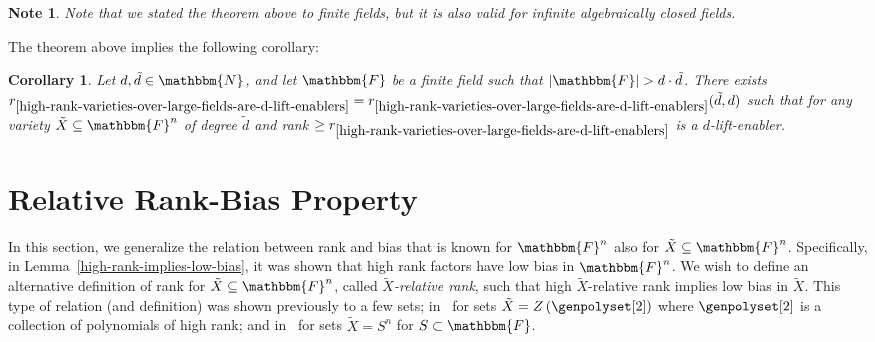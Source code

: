 \documentclass[10pt,a4paper]{article}
\newtheorem{corollary}[theorem]{Corollary}
\newtheorem*{note*}{Note}
\newcommand{\parens}[1]{\left( #1 \right)}
\newcommand{\basefield}[0]{\mathbbm{F}}
\newcommand{\blocklength}[0]{n}
\newcommand{\field}[0]{\basefield^{\blocklength}}
\newcommand{\degree}[0]{d}
\newcommand{\naturalnumbersset}[0]{\mathbbm{N}}
\newcommand{\variety}{{\tilde{X}}}
\newcommand{\varietydeg}[0]{\tilde{\degree}}
\newcommand{\zerofunc}[1]{Z \parens{#1}}
\newcommand{\rankfunc}[0]{{{{r}}}}
\newcommand{\abs}[1]{\left| #1 \right|}
\begin{document}
\begin{note*}
    Note that we stated the theorem above to finite fields, but it is also valid for infinite algebraically closed fields.
\end{note*}
The theorem above implies the following corollary:
\begin{corollary}
    Let $\degree, \varietydeg \in \naturalnumbersset$,
    and let $\basefield$ be a finite field such that $\abs{\basefield} > \degree \cdot \varietydeg$.
    There exists $\rankfunc_{\ref{high-rank-varieties-over-large-fields-are-d-lift-enablers}} = \rankfunc_{\ref{high-rank-varieties-over-large-fields-are-d-lift-enablers}}(\varietydeg, \degree)$
    such that for any variety $\variety \subseteq \field$ of degree $\varietydeg$ and rank $\geq \rankfunc_{\ref{high-rank-varieties-over-large-fields-are-d-lift-enablers}}$
    is a $\degree$-lift-enabler.
\end{corollary}


\section[Relative Rank-Bias Property]{Relative Rank-Bias Property}\label{sec:relative-rank-bias-property}
In this section, we generalize the relation between rank and bias that is known for $\field$ also for $\variety \subseteq \field$.
Specifically, in Lemma~\ref{high-rank-implies-low-bias}, it was shown that high rank factors have low bias in $\field$.
We wish to define an alternative definition of rank for $\variety \subseteq \field$, called \emph{$\variety$-relative rank},
such that high $\variety$-relative rank implies low bias in $\variety$.
This type of relation (and definition) was shown previously to a few sets;
in~\cite[Theorem 1.8]{lampert2021relative} for sets $\variety = \zerofunc{\genpolyset[2]}$ where $\genpolyset[2]$ is a collection of polynomials of high rank;
and in~\cite[Theorem 1.4]{gowers2022equidistributionhighrankpolynomialsvariables} for sets $\variety = S^\blocklength$ for $S \subset \basefield$.
\end{document}
